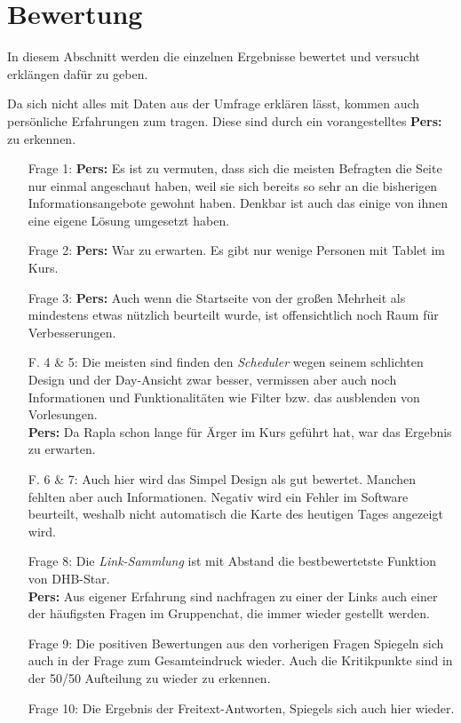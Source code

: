 \section{Bewertung}
In diesem Abschnitt werden die einzelnen Ergebnisse bewertet und versucht erklängen dafür zu geben.

Da sich nicht alles mit Daten aus der Umfrage erklären lässt, kommen auch persönliche Erfahrungen zum tragen. Diese sind durch ein vorangestelltes \textbf{Pers:} zu erkennen. 

\begin{itemize}
\item[Frage 1:]
	{\textbf{Pers:} Es ist zu vermuten, dass sich die meisten Befragten die Seite nur einmal angeschaut haben, weil sie sich bereits so sehr an die bisherigen Informationsangebote gewohnt haben. Denkbar ist auch das einige von ihnen eine eigene Lösung umgesetzt haben. }
\item[Frage 2:]
	{\textbf{Pers:} War zu erwarten. Es gibt nur wenige Personen mit Tablet im Kurs. }
\item[Frage 3:]
	{\textbf{Pers:} Auch wenn die Startseite von der großen Mehrheit als mindestens etwas nützlich beurteilt wurde, ist offensichtlich noch Raum für Verbesserungen.}
\item[F. 4 \& 5:]
	{Die meisten sind finden den \emph{Scheduler} wegen seinem schlichten Design und der Day-Ansicht zwar besser, vermissen aber auch noch Informationen und Funktionalitäten wie Filter bzw. das ausblenden von Vorlesungen. \\
	\textbf{Pers:} Da Rapla schon lange für Ärger im Kurs geführt hat, war das Ergebnis zu erwarten.}
\item[F. 6 \& 7:]
	{Auch hier wird das Simpel Design als gut bewertet. Manchen fehlten aber auch Informationen. Negativ wird ein Fehler im Software beurteilt, weshalb nicht automatisch die Karte des heutigen Tages angezeigt wird.}
\item [Frage 8:]
	{Die \emph{Link-Sammlung} ist mit Abstand die bestbewertetste Funktion von DHB-Star. \\
	\textbf{Pers:} Aus eigener Erfahrung sind nachfragen zu einer der Links auch einer der häufigsten Fragen im Gruppenchat, die immer wieder gestellt werden. }
\item [Frage 9:]
	{Die positiven Bewertungen aus den vorherigen Fragen Spiegeln sich auch in der Frage zum Gesamteindruck wieder. Auch die Kritikpunkte sind in der 50/50 Aufteilung zu wieder zu erkennen. }
\item [Frage 10:]
	{Die Ergebnis der Freitext-Antworten, Spiegels sich auch hier wieder.}
\end{itemize}

